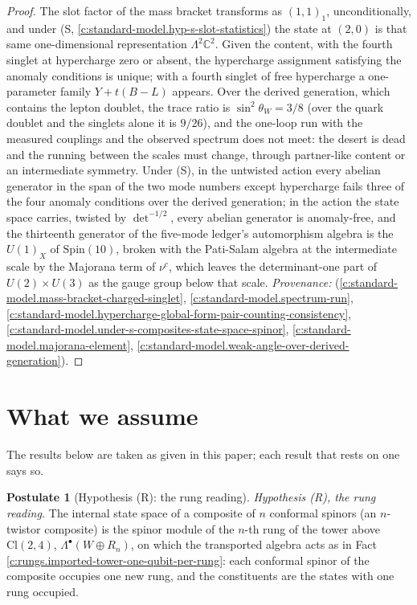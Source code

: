 \documentclass[11pt]{article}
\theoremstyle{definition}
\newtheorem{postulate}[theorem]{Postulate}
\theoremstyle{plain}
\providecommand{\C}{}\renewcommand{\C}{\mathbb{C}}
\providecommand{\Cl}{}\renewcommand{\Cl}{\mathrm{Cl}}
\begin{document}
\begin{proof}
The slot factor of the mass bracket transforms as $(1,1)_{1}$, unconditionally, and under (S, \ref{c:standard-model.hyp-s-slot-statistics}) the state at $(2,0)$ is that same one-dimensional representation $\Lambda^{2}\C^{2}$. Given the content, with the fourth singlet at hypercharge zero or absent, the hypercharge assignment satisfying the anomaly conditions is unique; with a fourth singlet of free hypercharge a one-parameter family $Y + t(B - L)$ appears. Over the derived generation, which contains the lepton doublet, the trace ratio is $\sin^{2}\theta_{W} = 3/8$ (over the quark doublet and the singlets alone it is $9/26$), and the one-loop run with the measured couplings and the observed spectrum does not meet: the desert is dead and the running between the scales must change, through partner-like content or an intermediate symmetry. Under (S), in the untwisted action every abelian generator in the span of the two mode numbers except hypercharge fails three of the four anomaly conditions over the derived generation; in the action the state space carries, twisted by $\det^{-1/2}$, every abelian generator is anomaly-free, and the thirteenth generator of the five-mode ledger's automorphism algebra is the $U(1)_{X}$ of $\mathrm{Spin}(10)$, broken with the Pati-Salam algebra at the intermediate scale by the Majorana term of $\nu^{c}$, which leaves the determinant-one part of $U(2) \times U(3)$ as the gauge group below that scale. \emph{Provenance:} \cite[Prop.~3.2, Prop.~5.8(1), (3), Thm.~5.5(3), Props.~6.1, 6.2, 10.7]{ButlerT12} (\ref{c:standard-model.mass-bracket-charged-singlet}, \ref{c:standard-model.spectrum-run}, \ref{c:standard-model.hypercharge-global-form-pair-counting-consistency}, \ref{c:standard-model.under-s-composites-state-space-spinor}, \ref{c:standard-model.majorana-element}, \ref{c:standard-model.weak-angle-over-derived-generation}).

\end{proof}

\section*{What we assume}
The results below are taken as given in this paper; each result that rests on one says so.
\begin{postulate}[Hypothesis (R): the rung reading]\label{c:rungs.hyp-r-rung-reading}
\emph{Hypothesis (R), the rung reading.} The internal state space of a composite of $n$ conformal spinors (an $n$-twistor composite) is the spinor module of the $n$-th rung of the tower above $\Cl(2,4)$, $\Lambda^{\bullet}(W \oplus R_{n})$, on which the transported algebra acts as in Fact \ref{c:rungs.imported-tower-one-qubit-per-rung}: each conformal spinor of the composite occupies one new rung, and the constituents are the states with one rung occupied.
\end{postulate}
\end{document}
